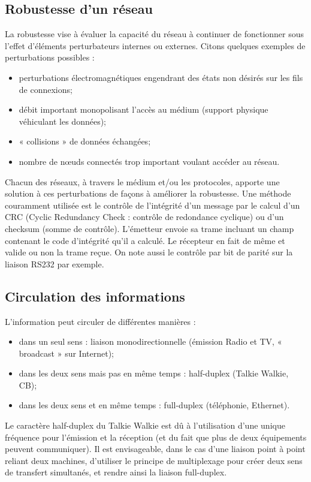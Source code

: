 \documentclass[10pt]{article}
\begin{document}
\subsection{Robustesse d'un réseau}

La robustesse vise à évaluer la capacité du réseau à continuer de fonctionner sous l’effet d’éléments perturbateurs internes ou externes.
Citons quelques exemples de perturbations possibles :
\begin{itemize}
\item perturbations électromagnétiques engendrant des états non désirés sur les fils de connexions;
\item débit important monopolisant l’accès au médium (support physique véhiculant les données);
\item « collisions » de données échangées;
\item nombre de nœuds connectés trop important voulant accéder au réseau.
\end{itemize}
Chacun des réseaux, à travers le médium et/ou les protocoles, apporte une solution à ces perturbations de façons à améliorer la robustesse.
Une méthode couramment utilisée est le contrôle de l’intégrité d’un message par le calcul d’un CRC (Cyclic Redundancy Check : contrôle de redondance cyclique) ou d’un checksum (somme de contrôle). L’émetteur envoie sa trame incluant un champ contenant le code d’intégrité qu’il a calculé. Le récepteur en fait de même et valide ou non la trame reçue. On note aussi le contrôle par bit de parité sur la liaison RS232 par exemple.


\subsection{Circulation des informations}

L’information peut circuler de différentes manières :
\begin{itemize}
\item dans un seul sens : liaison monodirectionnelle (émission Radio et TV, « broadcast » sur Internet);
\item dans les deux sens mais pas en même temps : half-duplex (Talkie Walkie, CB);
\item dans les deux sens et en même temps : full-duplex (téléphonie, Ethernet).
\end{itemize}

Le caractère half-duplex du Talkie Walkie est dû à l’utilisation d’une unique fréquence pour l’émission et la réception (et du fait que plus de deux équipements peuvent communiquer). Il est envisageable, dans le cas d’une liaison point à point reliant deux machines, d’utiliser le principe de multiplexage pour créer deux sens de transfert simultanés, et rendre ainsi la liaison full-duplex.
\end{document}
